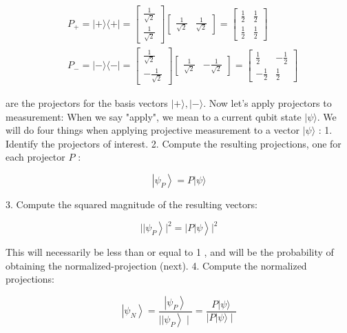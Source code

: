 \documentclass[main.tex]{subfiles}
\begin{document}
    $$
    \begin{aligned}
    &P_{+}=|+\rangle\langle+|=\left[\begin{array}{c}
    \frac{1}{\sqrt{2}} \\
    \frac{1}{\sqrt{2}}
    \end{array}\right]\left[\begin{array}{ll}
    \frac{1}{\sqrt{2}} & \frac{1}{\sqrt{2}}
    \end{array}\right]=\left[\begin{array}{cc}
    \frac{1}{2} & \frac{1}{2} \\
    \frac{1}{2} & \frac{1}{2}
    \end{array}\right] \\
    &P_{-}=|-\rangle\langle-|=\left[\begin{array}{r}
    \frac{1}{\sqrt{2}} \\
    -\frac{1}{\sqrt{2}}
    \end{array}\right]\left[\begin{array}{ll}
    \frac{1}{\sqrt{2}} & -\frac{1}{\sqrt{2}}
    \end{array}\right]=\left[\begin{array}{cc}
    \frac{1}{2} & -\frac{1}{2} \\
    -\frac{1}{2} & \frac{1}{2}
    \end{array}\right]
    \end{aligned}
    $$
    
    are the projectors for the basis vectors $|+\rangle,|-\rangle$. Now let's apply projectors to measurement: When we say "apply", we mean to a current qubit state $|\psi\rangle$. We will do four things when applying projective measurement to a vector $|\psi\rangle$ : 1. Identify the projectors of interest. 2. Compute the resulting projections, one for each projector $P$ :
    
    $$
    \left|\psi_{P}\right\rangle=P|\psi\rangle
    $$
    
    3. Compute the squared magnitude of the resulting vectors:
    
    $$
    \left.\left.|| \psi_{P}\right\rangle\left.\right|^{2}=|P| \psi\right\rangle\left.\right|^{2}
    $$
    
    This will necessarily be less than or equal to 1 , and will be the probability of obtaining the normalized-projection (next). 4. Compute the normalized projections:
    
    $$
    \left|\psi_{N}\right\rangle=\frac{\left|\psi_{P}\right\rangle}{\left.|| \psi_{P}\right\rangle \mid}=\frac{P|\psi\rangle}{|P| \psi\rangle \mid}
    $$
    
\end{document}
